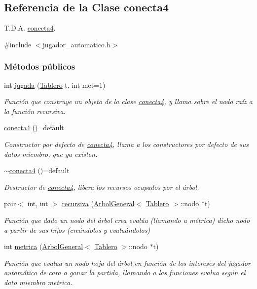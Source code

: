 \hypertarget{classconecta4}{\subsection{Referencia de la Clase conecta4}
\label{classconecta4}
}


T.\-D.\-A. \hyperlink{classconecta4}{conecta4}.  




{\ttfamily \#include $<$jugador\-\_\-automatico.\-h$>$}

\subsubsection*{Métodos públicos}
\begin{DoxyCompactItemize}
\item 
int \hyperlink{classconecta4_ac7d01569f1ced02ec3181eca20c744cc}{jugada} (\hyperlink{classTablero}{Tablero} t, int met=1)
\begin{DoxyCompactList}\small\item\em Función que construye un objeto de la clase \hyperlink{classconecta4}{conecta4}, y llama sobre el nodo raíz a la función recursiva. \end{DoxyCompactList}\item 
\hyperlink{classconecta4_a5a8081caded05340a5d807b79b55fb04}{conecta4} ()=default
\begin{DoxyCompactList}\small\item\em Constructor por defecto de \hyperlink{classconecta4}{conecta4}, llama a los constructores por defecto de sus datos miembro, que ya existen. \end{DoxyCompactList}\item 
\hyperlink{classconecta4_abd5f1ce0e6ade3986a62184b72c87ca6}{$\sim$conecta4} ()=default
\begin{DoxyCompactList}\small\item\em Destructor de \hyperlink{classconecta4}{conecta4}, libera los recursos ocupados por el árbol. \end{DoxyCompactList}\item 
pair$<$ int, int $>$ \hyperlink{classconecta4_a19e596653962db117fe9e802a12e97a2}{recursiva} (\hyperlink{classArbolGeneral}{Arbol\-General}$<$ \hyperlink{classTablero}{Tablero} $>$\-::nodo $\ast$t)
\begin{DoxyCompactList}\small\item\em Función que dado un nodo del árbol crea evalúa (llamando a métrica) dicho nodo a partir de sus hijos (creándolos y evaluándolos) \end{DoxyCompactList}\item 
int \hyperlink{classconecta4_a97f1de7e07d9a3acfb4d59e87f78246b}{metrica} (\hyperlink{classArbolGeneral}{Arbol\-General}$<$ \hyperlink{classTablero}{Tablero} $>$\-::nodo $\ast$t)
\begin{DoxyCompactList}\small\item\em Función que evalua un nodo hoja del árbol en función de los intereses del jugador automático de cara a ganar la partida, llamando a las funciones evalua según el dato miembro metrica. \end{DoxyCompactList}\end{DoxyCompactItemize}
